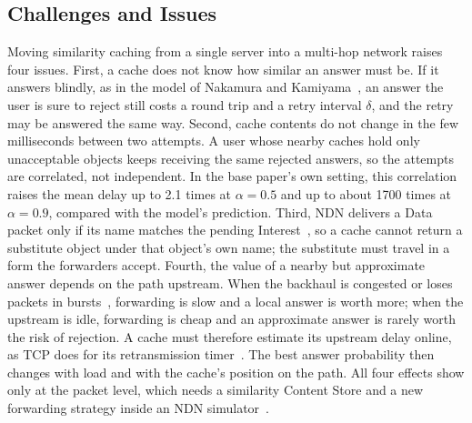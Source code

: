 \documentclass[11pt,a4paper]{article}
\begin{document}
\subsection{Challenges and Issues}
Moving similarity caching from a single server into a multi-hop network raises four issues. First,
a cache does not know how similar an answer must be. If it answers blindly, as in the model of
Nakamura and Kamiyama~\cite{nakamura2024analysis}, an answer the user is sure to reject still costs
a round trip and a retry interval $\delta$, and the retry may be answered the same way. Second,
cache contents do not change in the few milliseconds between two attempts. A user whose nearby
caches hold only unacceptable objects keeps receiving the same rejected answers, so the attempts
are correlated, not independent. In the base paper's own setting, this correlation raises the mean
delay up to 2.1 times at $\alpha = 0.5$ and up to about 1700 times at $\alpha = 0.9$, compared with
the model's prediction.
Third, NDN delivers a Data packet only if its name matches the pending Interest~\cite{zhang2014ndn},
so a cache cannot return a substitute object under that object's own name; the substitute must
travel in a form the forwarders accept. Fourth, the value of a nearby but approximate answer
depends on the path upstream. When the backhaul is congested or loses packets in
bursts~\cite{gilbert1960capacity,elliott1963estimates}, forwarding is slow and a local answer is
worth more; when the upstream is idle, forwarding is cheap and an approximate answer is rarely worth
the risk of rejection. A cache must therefore estimate its upstream delay online, as TCP does for
its retransmission timer~\cite{jacobson1988congestion,paxson2011rfc6298}. The best answer
probability then changes with load and with the cache's position on the path. All four effects
show only at the packet level, which needs a similarity Content Store and a new forwarding
strategy inside an NDN simulator~\cite{mastorakis2017ndnsim}.
\end{document}
